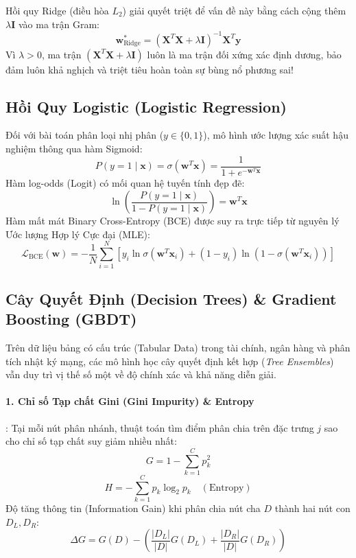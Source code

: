 Hồi quy Ridge (điều hòa $L_2$) giải quyết triệt để vấn đề này bằng cách cộng thêm $\lambda \mathbf{I}$ vào ma trận Gram:
\begin{equation}
\mathbf{w}_{\text{Ridge}}^* = (\mathbf{X}^T \mathbf{X} + \lambda \mathbf{I})^{-1} \mathbf{X}^T \mathbf{y}
\label{eq:ridge-solution}
\end{equation}
Vì $\lambda > 0$, ma trận $(\mathbf{X}^T \mathbf{X} + \lambda \mathbf{I})$ luôn là ma trận đối xứng xác định dương, bảo đảm luôn khả nghịch và triệt tiêu hoàn toàn sự bùng nổ phương sai!

\subsection{Hồi Quy Logistic (Logistic Regression)}
Đối với bài toán phân loại nhị phân ($y \in \{0, 1\}$), mô hình ước lượng xác suất hậu nghiệm thông qua hàm Sigmoid:
\begin{equation}
P(y=1 \mid \mathbf{x}) = \sigma(\mathbf{w}^T \mathbf{x}) = \frac{1}{1 + e^{-\mathbf{w}^T \mathbf{x}}}
\end{equation}
Hàm log-odds (Logit) có mối quan hệ tuyến tính đẹp đẽ:
\begin{equation}
\ln \left( \frac{P(y=1 \mid \mathbf{x})}{1 - P(y=1 \mid \mathbf{x})} \right) = \mathbf{w}^T \mathbf{x}
\end{equation}
Hàm mất mát Binary Cross-Entropy (BCE) được suy ra trực tiếp từ nguyên lý Ước lượng Hợp lý Cực đại (MLE):
\begin{equation}
\mathcal{L}_{\text{BCE}}(\mathbf{w}) = -\frac{1}{N} \sum_{i=1}^N \left[ y_i \ln \sigma(\mathbf{w}^T \mathbf{x}_i) + (1 - y_i) \ln(1 - \sigma(\mathbf{w}^T \mathbf{x}_i)) \right]
\end{equation}

\subsection{Cây Quyết Định (Decision Trees) \& Gradient Boosting (GBDT)}
Trên dữ liệu bảng có cấu trúc (Tabular Data) trong tài chính, ngân hàng và phân tích nhật ký mạng, các mô hình học cây quyết định kết hợp (\textit{Tree Ensembles}) vẫn duy trì vị thế số một về độ chính xác và khả năng diễn giải.

\paragraph{1. Chỉ số Tạp chất Gini (Gini Impurity) \& Entropy}:
Tại mỗi nút phân nhánh, thuật toán tìm điểm phân chia trên đặc trưng $j$ sao cho chỉ số tạp chất suy giảm nhiều nhất:
\begin{equation}
G = 1 - \sum_{k=1}^C p_k^2
\label{eq:gini-impurity-def}
\end{equation}
\begin{equation}
H = -\sum_{k=1}^C p_k \log_2 p_k \quad (\text{Entropy})
\end{equation}
Độ tăng thông tin (Information Gain) khi phân chia nút cha $D$ thành hai nút con $D_L, D_R$:
\begin{equation}
\Delta G = G(D) - \left( \frac{|D_L|}{|D|} G(D_L) + \frac{|D_R|}{|D|} G(D_R) \right)
\end{equation}

